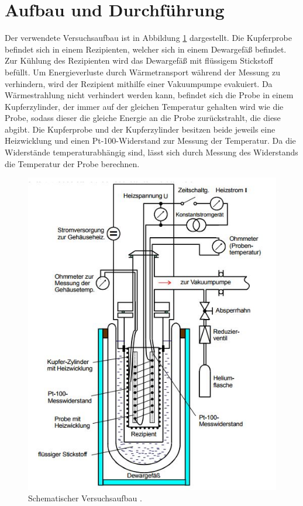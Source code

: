 \section{Aufbau und Durchführung}
Der verwendete Versuchsaufbau ist in Abbildung \ref{fig:aufbau} dargestellt. Die Kupferprobe befindet sich in einem Rezipienten,
welcher sich in einem Dewargefäß befindet. Zur Kühlung des Rezipienten wird das Dewargefäß mit flüssigem Stickstoff befüllt. Um Energieverluste
durch Wärmetransport während der Messung zu verhindern, wird der Rezipient mithilfe einer Vakuumpumpe evakuiert. Da Wärmestrahlung nicht verhindert werden kann,
befindet sich die Probe in einem Kupferzylinder, der immer auf der gleichen Temperatur gehalten wird wie die Probe, sodass dieser die gleiche Energie an die Probe
zurückstrahlt, die diese abgibt. Die Kupferprobe und der Kupferzylinder besitzen beide jeweils eine Heizwicklung und einen Pt-100-Widerstand zur Messung der Temperatur.
Da die Widerstände temperaturabhängig sind, lässt sich durch Messung des Widerstands die Temperatur der Probe berechnen.

\begin{figure}[h]
  \centering
  \includegraphics[scale=0.7]{graphics/Aufbau.jpg}
  \caption{Schematischer Versuchsaufbau \cite{anleitung}.}
  \label{fig:aufbau}
\end{figure}

